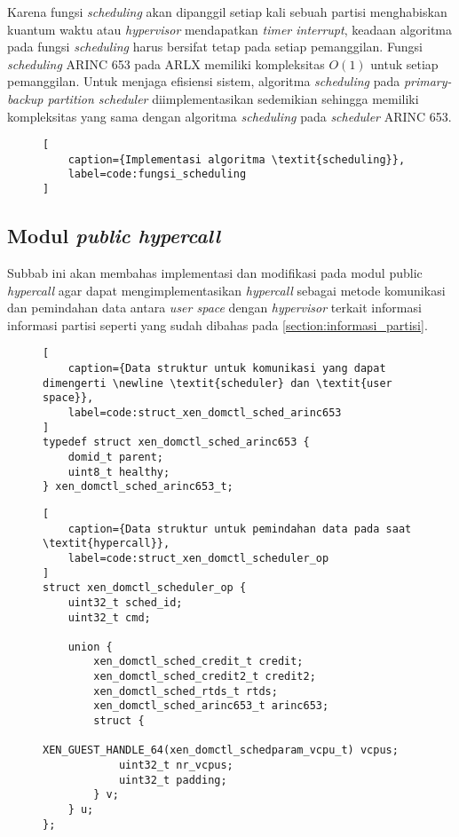 Karena fungsi \textit{scheduling} akan dipanggil setiap kali sebuah partisi menghabiskan kuantum
waktu atau \textit{hypervisor} mendapatkan \textit{timer interrupt}, keadaan algoritma pada
fungsi \textit{scheduling} harus bersifat tetap pada setiap pemanggilan. Fungsi
\textit{scheduling} ARINC 653 pada ARLX memiliki kompleksitas $O(1)$ untuk setiap pemanggilan.
Untuk menjaga efisiensi sistem, algoritma \textit{scheduling} pada \textit{primary-backup
partition scheduler} diimplementasikan sedemikian sehingga memiliki kompleksitas yang sama
dengan algoritma \textit{scheduling} pada \textit{scheduler} ARINC 653.

\begin{figure}
\begin{lstlisting}[
	caption={Implementasi algoritma \textit{scheduling}},
	label=code:fungsi_scheduling
]

\end{lstlisting}
\end{figure}

\subsection{Modul \textit{public hypercall}}
\label{section:modul_public_hypercall}

Subbab ini akan membahas implementasi dan modifikasi pada modul public \textit{hypercall} agar
dapat mengimplementasikan \textit{hypercall} sebagai metode komunikasi dan pemindahan data
antara \textit{user space} dengan \textit{hypervisor} terkait informasi informasi partisi
seperti yang sudah dibahas pada \autoref{section:informasi_partisi}.

\begin{figure}
\begin{lstlisting}[
	caption={Data struktur untuk komunikasi yang dapat dimengerti \newline \textit{scheduler} dan \textit{user space}},
	label=code:struct_xen_domctl_sched_arinc653
]
typedef struct xen_domctl_sched_arinc653 {
    domid_t parent;
    uint8_t healthy;
} xen_domctl_sched_arinc653_t;
\end{lstlisting}
\end{figure}

\begin{figure}
\begin{lstlisting}[
	caption={Data struktur untuk pemindahan data pada saat \textit{hypercall}},
	label=code:struct_xen_domctl_scheduler_op
]
struct xen_domctl_scheduler_op {
    uint32_t sched_id;
    uint32_t cmd;

    union {
        xen_domctl_sched_credit_t credit;
        xen_domctl_sched_credit2_t credit2;
        xen_domctl_sched_rtds_t rtds;
        xen_domctl_sched_arinc653_t arinc653;
        struct {
            XEN_GUEST_HANDLE_64(xen_domctl_schedparam_vcpu_t) vcpus;
            uint32_t nr_vcpus;
            uint32_t padding;
        } v;
    } u;
};
\end{lstlisting}
\end{figure}

